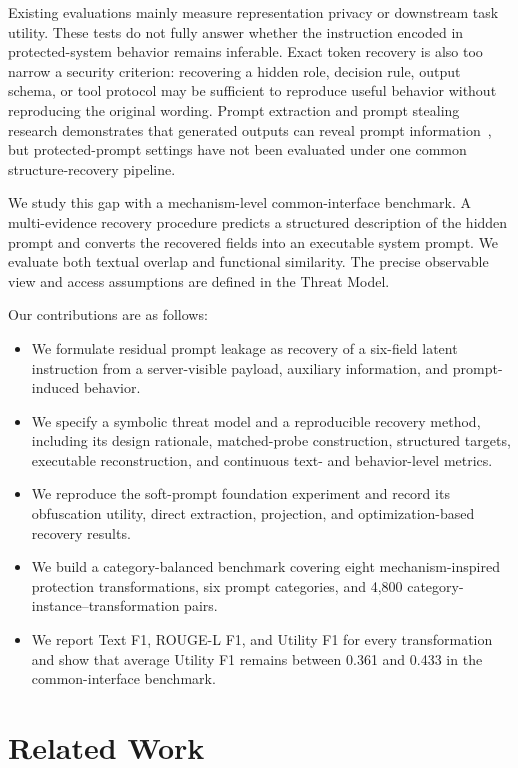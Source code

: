 \documentclass[letterpaper]{article} %
\begin{document}
Existing evaluations mainly measure representation privacy or downstream task utility.  These tests do not fully answer whether the instruction encoded in protected-system behavior remains inferable.  Exact token recovery is also too narrow a security criterion: recovering a hidden role, decision rule, output schema, or tool protocol may be sufficient to reproduce useful behavior without reproducing the original wording.  Prompt extraction and prompt stealing research demonstrates that generated outputs can reveal prompt information~\citep{zhang2024effective,sha2024promptstealing,hui2024pleak,deng2024promptleakage,das2025spe}, but protected-prompt settings have not been evaluated under one common structure-recovery pipeline.

We study this gap with a mechanism-level common-interface benchmark.  A multi-evidence recovery procedure predicts a structured description of the hidden prompt and converts the recovered fields into an executable system prompt.  We evaluate both textual overlap and functional similarity.  The precise observable view and access assumptions are defined in the Threat Model.

Our contributions are as follows:
\begin{itemize}
    \item We formulate residual prompt leakage as recovery of a six-field latent instruction from a server-visible payload, auxiliary information, and prompt-induced behavior.
    \item We specify a symbolic threat model and a reproducible recovery method, including its design rationale, matched-probe construction, structured targets, executable reconstruction, and continuous text- and behavior-level metrics.
    \item We reproduce the soft-prompt foundation experiment and record its obfuscation utility, direct extraction, projection, and optimization-based recovery results.
    \item We build a category-balanced benchmark covering eight mechanism-inspired protection transformations, six prompt categories, and 4,800 category-instance--transformation pairs.
    \item We report Text F1, ROUGE-L F1, and Utility F1 for every transformation and show that average Utility F1 remains between 0.361 and 0.433 in the common-interface benchmark.
\end{itemize}

\section{Related Work}
\end{document}
